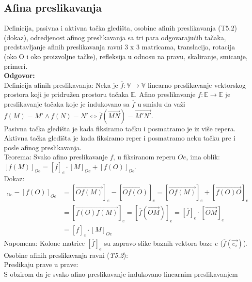 \documentclass[12pt]{article}
\begin{document}
    \subsection{Afina preslikavanja}
    Definicija, pasivna i aktivna tačka gledišta, osobine afinih
    preslikavanja (T5.2) (dokaz), odredjenost afinog
    preslikavanja sa tri para odgovarajućih tačaka,
    predstavljanje afinih preslikavanja ravni 3 x 3 matricama,
    translacija, rotacija (oko O i oko proizvoljne tačke), refleksija
    u odnosu na pravu, skaliranje, smicanje, primeri.
    \\
    \textbf{Odgovor:}\\
    Definicija afinih preslikavanja: Neka je $\overline{f}: \mathbb{V}\rightarrow\mathbb{V}$
    linearno preslikavanje vektorskog prostora koji je pridružen prostoru
    tačaka $\mathbb{E}$. Afino preslikavanje $f: \mathbb{E}\rightarrow\mathbb{E}$
    je preslikavanje tačaka koje je indukovano sa $\overline{f}$ u smislu
    da važi $f(M)=M'\land f(N)=N' \iff \overline{f}(\overrightarrow{MN})=\overrightarrow{M'N'}$.\\
    Pasivna tačka gledišta je kada fiksiramo tačku i posmatramo je iz više repera.\\
    Aktivna tačka gledišta je kada fiksiramo reper i posmatramo neku tačku pre i posle afinog preslikavanja.\\
    Teorema: Svako afino preslikavanje $f$, u fiksiranom reperu $Oe$, ima oblik:\\
$[f(M)]_{Oe}=[\overline{f}]_{e}\cdot[M]_{Oe}+[f(O)]_{Oe}$.\\
    Dokaz:
    \begin{align*}
        [f(M)]_{Oe}-[f(O)]_{Oe} & =[\overrightarrow{Of(M)}]_e-[\overrightarrow{Of(O)}]_e =[\overrightarrow{Of(M)}]_e+[\overrightarrow{f(O)O}]_e      \\
                                & =[\overrightarrow{f(O)f(M)}]_e=[\overline{f}(\overrightarrow{OM})]_e =[\overline{f}]_e\cdot[\overrightarrow{OM}]_e \\
                                & =[\overline{f}]_e\cdot[M]_{Oe}
    \end{align*}
    Napomena: Kolone matrice $[\overline{f}]_e$ su zapravo slike baznih vektora baze $e$ ($\overline{f}(\overrightarrow{e_i})$).\\
    Osobine afinih preslikavanja ravni (\textit{T5.2}):\\
    Preslikaju prave u prave:\\
    S obzirom da je svako afino preslikavanje indukovano linearnim preslikavanjem
\end{document}
